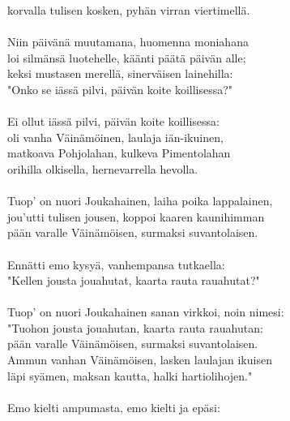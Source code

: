 korvalla tulisen kosken, pyhän virran viertimellä.          \\
                                                            \\
Niin päivänä muutamana, huomenna moniahana                  \\
loi silmänsä luotehelle, käänti päätä päivän alle;          \\
keksi mustasen merellä, sinerväisen lainehilla:             \\
"Onko se iässä pilvi, päivän koite koillisessa?"            \\
                                                            \\
Ei ollut iässä pilvi, päivän koite koillisessa:             \\
oli vanha Väinämöinen, laulaja iän-ikuinen,                 \\
matkoava Pohjolahan, kulkeva Pimentolahan                   \\
orihilla olkisella, hernevarrella hevolla.                  \\
                                                            \\
Tuop' on nuori Joukahainen, laiha poika lappalainen,        \\
jou'utti tulisen jousen, koppoi kaaren kaunihimman          \\
pään varalle Väinämöisen, surmaksi suvantolaisen.           \\
                                                            \\
Ennätti emo kysyä, vanhempansa tutkaella:                   \\
"Kellen jousta jouahutat, kaarta rauta rauahutat?"          \\
                                                            \\
Tuop' on nuori Joukahainen sanan virkkoi, noin nimesi:      \\
"Tuohon jousta jouahutan, kaarta rauta rauahutan:           \\
pään varalle Väinämöisen, surmaksi suvantolaisen.           \\
Ammun vanhan Väinämöisen, lasken laulajan ikuisen           \\
läpi syämen, maksan kautta, halki hartiolihojen."           \\
                                                            \\
Emo kielti ampumasta, emo kielti ja epäsi:                  \\
